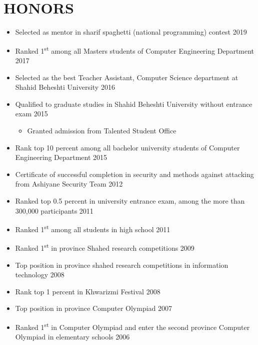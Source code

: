 \documentclass[10pt,a4paper,sans]{moderncv} %
\begin{document}
	\section{HONORS}
	\begin{itemize}
		\item Selected as mentor in sharif spaghetti (national programming) contest \hfill 2019

		\item Ranked 1\textsuperscript{st} among all Masters students of Computer Engineering Department \hfill 2017
		
		\item Selected as the best Teacher Assistant, Computer Science department at Shahid Beheshti University \hfill 2016
		
		\item Qualified to graduate studies in Shahid Beheshti University without entrance exam \hfill 2015		
		\begin{itemize}
			\item Granted admission from Talented Student Office
		\end{itemize}

		\item Rank top 10 percent  among all bachelor university students of Computer Engineering Department  \hfill 2015	
		
		\item Certificate of successful completion in  security and methods against attacking from Ashiyane Security Team \hfill 2012 
		
		\item Ranked top 0.5 percent  in university entrance exam, among the more than 300,000 participants \hfill 2011 
		
		\item Ranked 1\textsuperscript{st} among all students in high school \hfill 2011

		\item Ranked 1\textsuperscript{st} in province Shahed research competitions \hfill 2009
		
		\item Top position in province shahed research competitions in information technology \hfill 2008 

		\item Rank top 1 percent in Khwarizmi Festival  \hfill 2008 
		
		\item Top position in province Computer Olympiad \hfill 2007 

		\item Ranked 1\textsuperscript{st} in Computer Olympiad and enter the second province Computer Olympiad in elementary schools \hfill 2006
	\end{itemize}
	\fi
	\vspace{0.7em}
\end{document}
